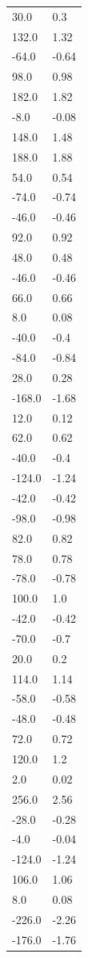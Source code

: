 \begin{longtable}{ll}
30.0 & 0.3 \\
132.0 & 1.32 \\
-64.0 & -0.64 \\
98.0 & 0.98 \\
182.0 & 1.82 \\
-8.0 & -0.08 \\
148.0 & 1.48 \\
188.0 & 1.88 \\
54.0 & 0.54 \\
-74.0 & -0.74 \\
-46.0 & -0.46 \\
92.0 & 0.92 \\
48.0 & 0.48 \\
-46.0 & -0.46 \\
66.0 & 0.66 \\
8.0 & 0.08 \\
-40.0 & -0.4 \\
-84.0 & -0.84 \\
28.0 & 0.28 \\
-168.0 & -1.68 \\
12.0 & 0.12 \\
62.0 & 0.62 \\
-40.0 & -0.4 \\
-124.0 & -1.24 \\
-42.0 & -0.42 \\
-98.0 & -0.98 \\
82.0 & 0.82 \\
78.0 & 0.78 \\
-78.0 & -0.78 \\
100.0 & 1.0 \\
-42.0 & -0.42 \\
-70.0 & -0.7 \\
20.0 & 0.2 \\
114.0 & 1.14 \\
-58.0 & -0.58 \\
-48.0 & -0.48 \\
72.0 & 0.72 \\
120.0 & 1.2 \\
2.0 & 0.02 \\
256.0 & 2.56 \\
-28.0 & -0.28 \\
-4.0 & -0.04 \\
-124.0 & -1.24 \\
106.0 & 1.06 \\
8.0 & 0.08 \\
-226.0 & -2.26 \\
-176.0 & -1.76 \\

\end{longtable}
